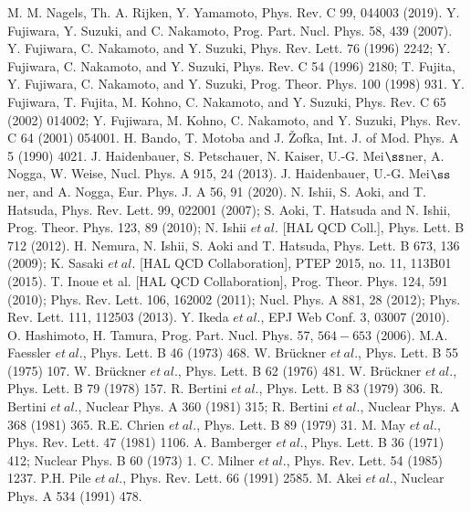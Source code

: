 \begin{thebibliography}{99}
M. M. Nagels, Th. A. Rijken, Y. Yamamoto, Phys. Rev. C 99, 044003 (2019).
Y. Fujiwara, Y. Suzuki, and C. Nakamoto, Prog. Part. Nucl. Phys. 58, 439 (2007).
Y. Fujiwara, C. Nakamoto, and Y. Suzuki, Phys. Rev. Lett. 76 (1996) 2242; Y. Fujiwara, C. Nakamoto, and Y. Suzuki, Phys. Rev. C 54 (1996) 2180; T. Fujita, Y. Fujiwara, C. Nakamoto, and Y. Suzuki, Prog. Theor. Phys. 100 (1998) 931.
Y. Fujiwara, T. Fujita, M. Kohno, C. Nakamoto, and Y. Suzuki, Phys. Rev. C 65 (2002) 014002; Y. Fujiwara, M. Kohno, C. Nakamoto, and Y. Suzuki, Phys. Rev. C 64 (2001) 054001.
H. Bando, T. Motoba and J. \v{Z}ofka, Int. J. of Mod. Phys. A 5 (1990) 4021.
J. Haidenbauer, S. Petschauer, N. Kaiser, U.-G. Mei$\ss$ner, A. Nogga, W. Weise, Nucl. Phys. A 915, 24 (2013).
J. Haidenbauer, U.-G. Mei$\ss$ner, and A. Nogga, Eur. Phys. J. A 56, 91 (2020).
N. Ishii, S. Aoki, and T. Hatsuda, Phys. Rev. Lett. 99, 022001 (2007); S. Aoki, T. Hatsuda and N. Ishii, Prog. Theor. Phys. 123, 89 (2010); N. Ishii $et\ al.$ [HAL QCD Coll.], Phys. Lett. B 712 (2012).
H. Nemura, N. Ishii, S. Aoki and T. Hatsuda, Phys. Lett. B 673, 136 (2009); K. Sasaki $et\ al.$ [HAL QCD Collaboration], PTEP 2015, no. 11, 113B01 (2015).
T. Inoue et al. [HAL QCD Collaboration], Prog. Theor. Phys. 124, 591 (2010); Phys. Rev. Lett. 106, 162002 (2011); Nucl. Phys. A 881, 28 (2012); Phys. Rev. Lett. 111, 112503 (2013).
Y. Ikeda $et\ al.$, EPJ Web Conf. 3, 03007 (2010).
O. Hashimoto, H. Tamura, Prog. Part. Nucl. Phys. 57, $564-653$ (2006).
M.A. Faessler $et\ al.$, Phys. Lett. B 46 (1973) 468.
W. Br\"{u}ckner $et\ al.$, Phys. Lett. B 55 (1975) 107.
W. Br\"{u}ckner $et\ al.$, Phys. Lett. B 62 (1976) 481.
W. Br\"{u}ckner $et\ al.$, Phys. Lett. B 79 (1978) 157.
R. Bertini $et\ al.$, Phys. Lett. B 83 (1979) 306.
R. Bertini $et\ al.$, Nuclear Phys. A 360 (1981) 315; R. Bertini $et\ al.$, Nuclear Phys. A 368 (1981) 365.
R.E. Chrien $et\ al.$, Phys. Lett. B 89 (1979) 31.
M. May $et\ al.$, Phys. Rev. Lett. 47 (1981) 1106.
A. Bamberger $et\ al.$, Phys. Lett. B 36 (1971) 412; Nuclear Phys. B 60 (1973) 1.
C. Milner $et\ al.$, Phys. Rev. Lett. 54 (1985) 1237.
P.H. Pile $et\ al.$, Phys. Rev. Lett. 66 (1991) 2585.
M. Akei $et\ al.$, Nuclear Phys. A 534 (1991) 478.

\end{thebibliography}
